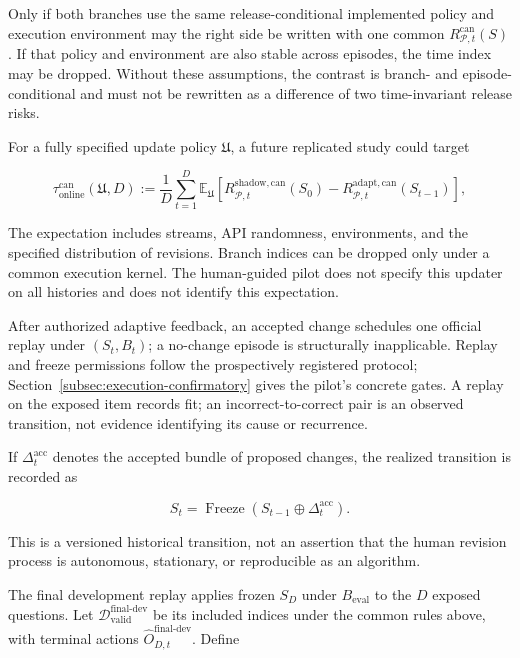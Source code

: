 \documentclass[10pt]{article} %
\providecommand{\1}{\mathbf{1}}  %
\theoremstyle{remark}
\theoremstyle{definition}
\begin{document}
Only if both branches use the same release-conditional implemented policy and execution environment may the right side be written with one common $R_{\mathcal P,t}^{\mathrm{can}}(S)$. If that policy and environment are also stable across episodes, the time index may be dropped. Without these assumptions, the contrast is branch- and episode-conditional and must not be rewritten as a difference of two time-invariant release risks.

For a fully specified update policy $\mathfrak U$, a future replicated study could target

\begin{equation}
\tau_{\mathrm{online}}^{\mathrm{can}}(\mathfrak U,D)
:=
\frac1D
\sum_{t=1}^{D}
\mathbb E_{\mathfrak U}\!\left[
R_{\mathcal P,t}^{\mathrm{shadow},\mathrm{can}}(S_0)
-
R_{\mathcal P,t}^{\mathrm{adapt},\mathrm{can}}(S_{t-1})
\right],
\label{eq:population-online-adaptation-contrast}
\end{equation}

The expectation includes streams, API randomness, environments, and the
specified distribution of revisions. Branch indices can be dropped only
under a common execution kernel. The human-guided pilot does not specify
this updater on all histories and does not identify this expectation.

After authorized adaptive feedback, an accepted change schedules one
official replay under $(S_t,B_t)$; a no-change episode is structurally
inapplicable. Replay and freeze permissions follow the prospectively
registered protocol; Section~\ref{subsec:execution-confirmatory} gives
the pilot's concrete gates. A replay on the exposed
item records fit; an incorrect-to-correct pair is an observed transition,
not evidence identifying its cause or recurrence.

If $\Delta_t^{\mathrm{acc}}$ denotes the accepted bundle of proposed changes, the realized transition is recorded as

\begin{equation}
S_t
=
\operatorname{Freeze}\!\left(
S_{t-1}\oplus\Delta_t^{\mathrm{acc}}
\right).
\label{eq:version-transition}
\end{equation}

This is a versioned historical transition, not an assertion that the human revision process is autonomous, stationary, or reproducible as an algorithm.

The final development replay applies frozen $S_D$ under
$B_{\mathrm{eval}}$ to the $D$ exposed questions. Let
$\mathcal D_{\mathrm{valid}}^{\mathrm{final\mbox{-}dev}}$ be its
included indices under the common rules above, with terminal actions
$\widehat O_{D,t}^{\mathrm{final\mbox{-}dev}}$. Define
\end{document}
